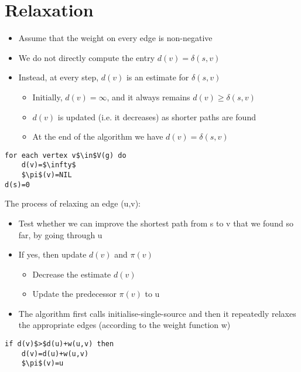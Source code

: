 \documentclass{article}[18pt]
\begin{document}
\section{Relaxation}
\begin{itemize}
	\item Assume that the weight on every edge is non-negative
	\item We do not directly compute the entry $d(v)=\delta(s,v)$ 
	\item Instead, at every step, $d(v)$ is an estimate for $\delta(s,v)$
	\begin{itemize}
		\item Initially, $d(v)=\infty$, and it always remains $d(v)\geqslant \delta(s,v)$
		\item $d(v)$ is updated (i.e. it decreases) as shorter paths are found
		\item At the end of the algorithm we have $d(v)=\delta(s,v)$
	\end{itemize}
\end{itemize}
\begin{lstlisting}[caption=Initialise-Single-Source({G,s})]
for each vertex v$\in$V(g) do
	d(v)=$\infty$
	$\pi$(v)=NIL
d(s)=0
\end{lstlisting}
The process of relaxing an edge (u,v):
\begin{itemize}
	\item Test whether we can improve the shortest path from s to v that we found so far, by going through u
	\item If yes, then update $d(v)$ and $\pi(v)$
	\begin{itemize}
		\item Decrease the estimate $d(v)$
		\item Update the predecessor $\pi(v)$ to u
	\end{itemize}
	\item The algorithm first calls initialise-single-source and then it repeatedly relaxes the appropriate edges (according to the weight function w)
\end{itemize}
\begin{lstlisting}[caption=Relax({u,v,w})]
if d(v)$>$d(u)+w(u,v) then
	d(v)=d(u)+w(u,v)
	$\pi$(v)=u
\end{lstlisting}
\end{document}
